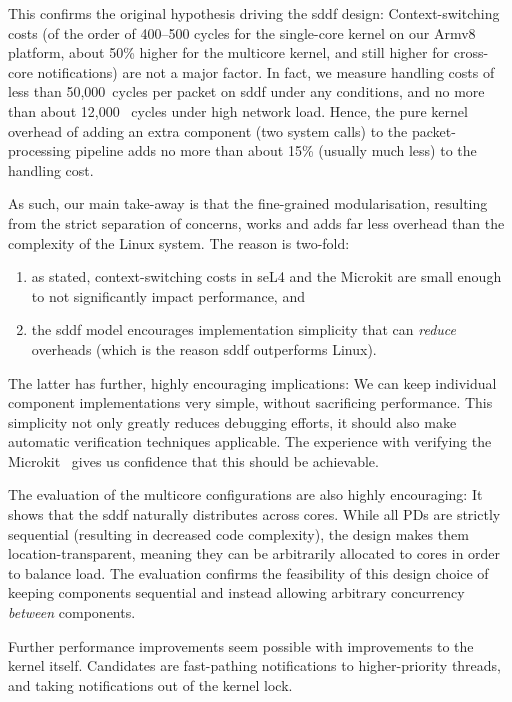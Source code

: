 \documentclass[a4paper,12pt]{report}
\begin{document}
This confirms the original hypothesis driving
the \gls{sddf} design: Context-switching costs (of the order of 400--500 cycles
for the single-core kernel on our Armv8 platform, about 50\% higher
for the multicore kernel, and still higher for cross-core
notifications) are not a major factor. In fact, we measure
handling costs of less than 50,000~cycles per packet on \gls{sddf} under any
conditions, and no more than about 12,000~ cycles under high network
load. Hence, the pure kernel overhead of adding an extra component
(two system calls) to
the packet-processing pipeline adds no more than about 15\% (usually
much less) to the handling cost.

As such, our main take-away is that the fine-grained modularisation,
resulting from the strict separation of concerns, works and adds
far less overhead than the complexity of the Linux system. The reason is two-fold:
\begin{enumerate}
\item as stated, context-switching costs in seL4 and the Microkit are
  small enough to not significantly impact performance, and
\item the \gls{sddf} model encourages implementation simplicity that can
  \emph{reduce} overheads (which is the reason \gls{sddf} outperforms Linux).
\end{enumerate}

The latter has further, highly encouraging implications: We can keep
individual component implementations very simple, without sacrificing
performance. This simplicity not only greatly reduces debugging
efforts, it should also make automatic verification techniques
applicable. The experience with verifying the
Microkit~\citep{Paturel_SH_23} gives us confidence that this should be
achievable.

The evaluation of the multicore configurations are also highly encouraging: It shows that the \gls{sddf}
naturally distributes across cores. While all PDs are strictly
sequential (resulting in decreased code complexity), the design makes
them location-transparent, meaning they can be arbitrarily allocated to cores
in order to balance load. The evaluation confirms the feasibility of
this design choice of keeping components sequential and instead allowing arbitrary concurrency
\emph{between} components.

Further performance improvements seem possible with improvements to
the kernel itself. Candidates are fast-pathing notifications to
higher-priority threads, and taking notifications out of the kernel lock.
\end{document}
